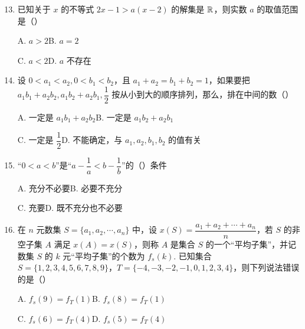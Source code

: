 \documentclass[a4paper,11pt]{article}
\begin{document}
\begin{enumerate}
\setcounter{enumi}{12}

\item 已知关于 $x$ 的不等式 $2x-1>a(x-2)$ 的解集是 $\mathbb{R}$，则实数 $a$ 的取值范围是\mbox{（\quad）}

\keepwithprev
A. $a>2$\qquad B. $a=2$

C. $a<2$\qquad D. $a$ 不存在


\item 设 $0<a_1<a_2,0<b_1<b_2$，且 $a_1+a_2=b_1+b_2=1$，如果要把 $a_1b_1+a_2b_2,a_1b_2+a_2b_1,\dfrac12$ 按从小到大的顺序排列，那么，排在中间的数\mbox{（\quad）}

\keepwithprev
A. 一定是 $a_1b_1+a_2b_2$\qquad B. 一定是 $a_1b_2+a_2b_1$

C. 一定是 $\dfrac12$\qquad D. 不能确定，与 $a_1,a_2,b_1,b_2$ 的值有关


\item “$0<a<b$”是“$a-\dfrac1a<b-\dfrac1b$”的\mbox{（\quad）}条件

\keepwithprev
A. 充分不必要\qquad B. 必要不充分

C. 充要\qquad D. 既不充分也不必要


\item 在 $n$ 元数集 $S=\{a_1,a_2,\cdots,a_n\}$ 中，设 $x(S)=\dfrac{a_1+a_2+\cdots+a_n}{n}$，若 $S$ 的非空子集 $A$ 满足 $x(A)=x(S)$，则称 $A$ 是集合 $S$ 的一个“平均子集”，并记数集 $S$ 的 $k$ 元“平均子集”的个数为 $f_s(k)$. 已知集合 $S=\{1,2,3,4,5,6,7,8,9\}$，$T=\{-4,-3,-2,-1,0,1,2,3,4\}$，则下列说法错误的是\mbox{（\quad）}

\keepwithprev
A. $f_s(9)=f_T(1)$\qquad B. $f_s(8)=f_T(1)$

C. $f_s(6)=f_T(4)$\qquad D. $f_s(5)=f_T(4)$


\ifanswer
\solbegin
{}
\solend
\fi

\end{enumerate}
\end{document}
